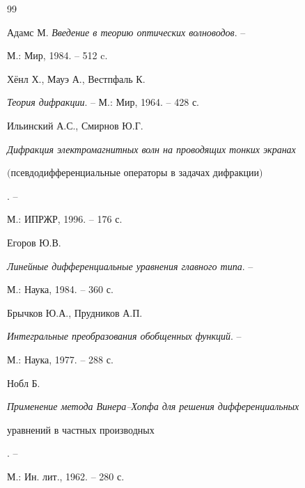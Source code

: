 \begin{thebibliography}{99}


Адамс М. {\em Введение в теорию оптических волноводов}. --


М.: Мир, 1984. -- 512 c.







Х\"енл Х., Мауэ А., Вестпфаль К.


{\em Теория дифракции}. -- М.: Мир, 1964. -- 428 с.







Ильинский А.С., Смирнов Ю.Г.


{\em Дифракция электромагнитных волн на проводящих тонких экранах


$($псевдодифференциальные операторы в задачах дифракции$)$}. --


М.: ИПРЖР, 1996. -- 176 с.







Егоров Ю.В.


{\em Линейные дифференциальные уравнения главного типа}. --


М.: Наука, 1984. -- 360 с.







Брычков Ю.А., Прудников А.П.


{\em Интегральные преобразования обобщенных функций}. --


М.: Наука, 1977. -- 288 с.







Нобл Б. {\em Применение метода Винера--Хопфа для решения дифференциальных


уравнений в частных производных}. --


М.: Ин. лит., 1962. -- 280 с.





\end{thebibliography}





\vskip 2cm












\label{end}





